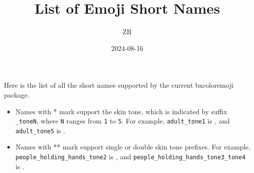 \documentclass[a4paper]{article}
\title{List of Emoji Short Names}
\author{ZR}
\date{2024-08-16}
\begin{document}
\maketitle

Here is the list of all the short names supported by
the current bxcoloremoji package.
\begin{itemize}
\item Names with * mark support the skin tone,
  which is indicated by suffix \verb|_toneN|,
  where \texttt{N} ranges from \texttt{1} to \texttt{5}.
  For example,
  \verb|adult_tone1| is , and
  \verb|adult_tone5| is .
\item Names with ** mark support single or double skin tone prefixes.
  For example,
  \verb|people_holding_hands_tone2| is
  , and
  \verb|people_holding_hands_tone3_tone4| is
  .
\end{itemize}

\MakeShortVerb{\!}
\setlength{\tabcolsep}{1em}
\setlength{\arrayrulewidth}{1pt}
\newcommand*{\cHead}[2]{%
  \multicolumn{1}{c}{%
    \raisebox{0pt}[1.2em][0.5em]{\makebox[#1em][c]{%
      \small\bfseries\textcolor{myhead}{#2}}}}}
\newcommand*{\cCE}[1]{%
  \raisebox{-0.2em}[1.2em][0.6em]{%
    \scalebox{1.4}{\coloremojicode{:#1:}}}}
\newcommand*{\cCS}[1]{#1}
\end{document}
